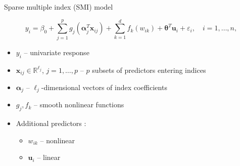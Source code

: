 \documentclass[
  12pt,
  ignorenonframetext,
  aspectratio=169,
]{beamer}
\begin{document}
\begin{frame}{Sparse multiple index (SMI) model}
\label{sparse-multiple-index-smi-model}
\begin{block}{}
$$y_{i} = \beta_{0} + \sum_{j = 1}^{p}g_{j}(\bm{\alpha}_{j}^{T}\bm{x}_{ij}) + \sum_{k = 1}^{d}f_{k}(w_{ik}) + \bm{\theta}^{T}\bm{u}_{i} + \varepsilon_{i}, \quad i = 1, \dots, n,$$
\end{block}

\begin{itemize}
  \item \small \color{black} $y_{i}$ -- \color{violet} univariate response
  \item \small \color{black} $\bm{x}_{ij} \in \mathbb{R}^{\ell_{j}}$, $j = 1, \dots, p$ -- \color{violet} $p$ subsets of predictors entering indices
  \item \small \color{black} $\bm{\alpha}_{j}$ -- \color{violet} $\ell_{j}$-dimensional vectors of index coefficients
  \item \small \color{black} $g_{j}, f_{k}$ -- \color{violet} smooth nonlinear functions
  \item \small \color{black} Additional predictors :
    \begin{itemize}
      \item \small $w_{ik}$  --   \color{violet} nonlinear
      \item \small \color{black} $\bm{u}_{i}$  --   \color{violet} linear
    \end{itemize}
\end{itemize}
\end{frame}
\end{document}
